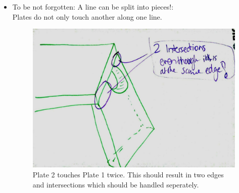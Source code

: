 \documentclass[../ClassicThesis.tex]{subfiles}
\begin{document}
\begin{itemize}
    \item To be not forgotten: A line can be split into pieces!:\\
    Plates do not only touch another along one line. 
    \begin{figure}[!ht]
    \centering
    \includegraphics[width=0.5\columnwidth]{Images/06-2-joints-moreThanOneLinePerEdge.jpg}
    \caption{Plate 2 touches Plate 1 twice. This should result in two edges and intersections which should be handled seperately.}
    \end{figure}
    

\end{itemize}
\end{document}
